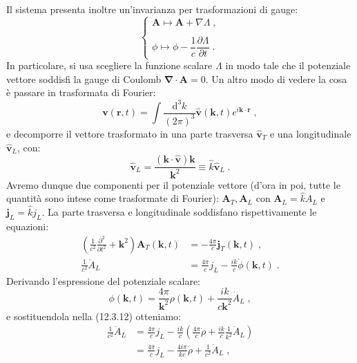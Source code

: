 \documentclass[10pt,a4paper]{report}
\theoremstyle{definition}
\numberwithin{equation}{section}
\newcommand{\diff}[1][]{\mathrm{d}#1}
\newcommand{\bnabla}{\boldsymbol{\nabla}}
\begin{document}
Il sistema presenta inoltre un'invarianza per trasformazioni di gauge:
\begin{equation}
\begin{cases}
\mathbf{A}\longmapsto \mathbf{A}+\nabla\Lambda\;, \\
\\
\phi\longmapsto\phi-\dfrac{1}{c}\dfrac{\partial\Lambda}{\partial t}\;.
\end{cases}
\end{equation}
In particolare, si usa scegliere la funzione scalare $\Lambda$ in modo tale che il potenziale vettore soddisfi la gauge di Coulomb $\bnabla\cdot\mathbf{A}=0$. Un altro modo di vedere la cosa è passare in trasformata di Fourier:
\begin{equation}
\mathbf{v}(\mathbf{r},t)=\int\frac{\diff^3{k}}{(2\pi)^3}\hat{\mathbf{v}}(\mathbf{k},t)e^{i\mathbf{k}\cdot\mathbf{r}}\;,
\end{equation}
e decomporre il vettore trasformato in una parte trasversa $\hat{\mathbf{v}}_T$ e una longitudinale $\hat{\mathbf{v}}_L$, con:
\begin{equation}
\hat{\mathbf{v}}_L=\frac{(\mathbf{k}\cdot\hat{\mathbf{v}})\mathbf{k}}{\mathbf{k}^2}\equiv \hat{k}\hat{\mathbf{v}}_L\;.
\end{equation}
Avremo dunque due componenti per il potenziale vettore (d'ora in poi, tutte le quantità sono intese come trasformate di Fourier): $\mathbf{A}_T,\mathbf{A}_L$ con $\mathbf{A}_L=\hat{k}A_L$ e $\mathbf{j}_L=\hat{k}j_L$. La parte trasversa e longitudinale soddisfano rispettivamente le equazioni:
\begin{align}
\left(\frac{1}{c^2}\frac{\partial^2}{\partial t^2}+\mathbf{k}^2\right)\mathbf{A}_T(\mathbf{k},t)&=-\frac{4\pi}{c}\mathbf{j}_T(\mathbf{k},t)\;, \\
\frac{1}{c^2}\ddot{A}_L &= \frac{4\pi}{c}j_L-\frac{ik}{c}\dot{\phi}(\mathbf{k},t)\;.
\end{align}
Derivando l'espressione del potenziale scalare:
\begin{equation}
\phi(\mathbf{k},t)=\frac{4\pi}{\mathbf{k}^2}\rho(\mathbf{k},t)+\frac{ik}{c\mathbf{k}^2}\dot{A}_L\;,
\end{equation}
e sostituendola nella (12.3.12) otteniamo:
\begin{align*}
\frac{1}{c^2}\ddot{A}_L&=\frac{4\pi}{c}j_L-\frac{ik}{c}\left(\frac{4\pi}{c}\dot{\rho}+\frac{ik}{c}\frac{1}{k^2}\ddot{A}_L\right) \\
&= \frac{4\pi}{c}j_L-\frac{4i\pi}{kc}\dot{\rho}+\frac{1}{c^2}\ddot{A}_L\;,
\end{align*}
\end{document}
